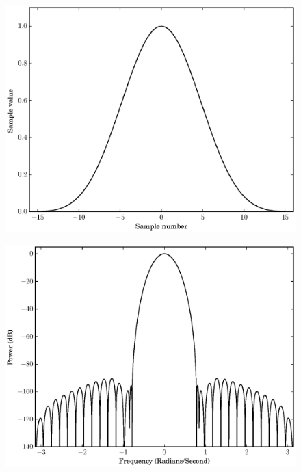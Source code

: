 \begin{figure}[!t]
    \centering
    \includegraphics[width=\figwidthscale\textwidth]{plots/c1_blackman_td.eps}
    \CaptionWithTitle{%
    }{\label{plot:c1blackmantd}}
\end{figure}

\begin{figure}[!t]
    \centering
    \includegraphics[width=\figwidthscale\textwidth]{plots/c1_blackman_fd.eps}
    \CaptionWithTitle{%
    }{\label{plot:c1blackmanfd}}
\end{figure}

